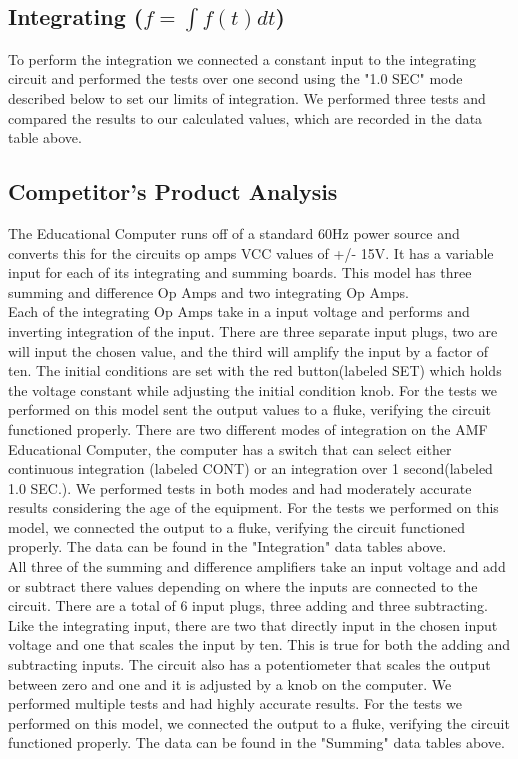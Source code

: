 \documentclass[11pt]{article}
\begin{document}
\subsection*{Integrating ($f=\int$$f(t) {d}t$)}
	To perform the integration we connected a constant input to the integrating circuit and performed the tests over one second using the "1.0 SEC" mode described below to set our limits of integration. We performed three tests and compared the results to our calculated values, which are recorded in the data table above. 
		
\subsection*{Competitor's Product Analysis}
	
	The Educational Computer runs off of a standard 60Hz power source and converts this for the circuits op amps VCC values of +/- 15V. It has a variable input for each of its integrating and summing boards. This model has three summing and difference Op Amps and two integrating Op Amps. \\
	
	Each of the integrating Op Amps take in a input voltage and performs and inverting integration of the input. There are three separate input plugs, two are will input the chosen value, and the third will amplify the input by a factor of ten. The initial conditions are set with the red button(labeled SET) which holds the voltage constant while adjusting the initial condition knob. For the tests we performed on this model sent the output values to a fluke, verifying the circuit functioned properly. There are two different modes of integration on the AMF Educational Computer, the computer has a switch that can select either continuous integration (labeled CONT) or an integration over 1 second(labeled 1.0 SEC.). We performed tests in both modes and had moderately accurate results considering the age of the equipment. For the tests we performed on this model, we connected the output to a fluke, verifying the circuit functioned properly. The data can be found in the "Integration" data tables above. \\
	
	All three of the summing and difference amplifiers take an input voltage and add or subtract there values depending on where the inputs are connected to the circuit. There are a total of 6 input plugs, three adding and three subtracting. Like the integrating input, there are two  that directly input in the chosen input voltage and one that scales the input by ten. This is true for both the adding and subtracting inputs. The circuit also has a potentiometer that scales the output between zero and one and it is adjusted by a knob on the computer. We performed multiple tests and had highly accurate results. For the tests we performed on this model, we connected the output to a fluke, verifying the circuit functioned properly. The data can be found in the "Summing" data tables above.
\end{document}
